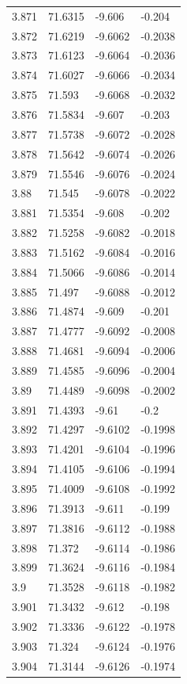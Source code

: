 \begin{tabular}{llll}
3.871 & 71.6315 & -9.606 & -0.204 \\
3.872 & 71.6219 & -9.6062 & -0.2038 \\
3.873 & 71.6123 & -9.6064 & -0.2036 \\
3.874 & 71.6027 & -9.6066 & -0.2034 \\
3.875 & 71.593 & -9.6068 & -0.2032 \\
3.876 & 71.5834 & -9.607 & -0.203 \\
3.877 & 71.5738 & -9.6072 & -0.2028 \\
3.878 & 71.5642 & -9.6074 & -0.2026 \\
3.879 & 71.5546 & -9.6076 & -0.2024 \\
3.88 & 71.545 & -9.6078 & -0.2022 \\
3.881 & 71.5354 & -9.608 & -0.202 \\
3.882 & 71.5258 & -9.6082 & -0.2018 \\
3.883 & 71.5162 & -9.6084 & -0.2016 \\
3.884 & 71.5066 & -9.6086 & -0.2014 \\
3.885 & 71.497 & -9.6088 & -0.2012 \\
3.886 & 71.4874 & -9.609 & -0.201 \\
3.887 & 71.4777 & -9.6092 & -0.2008 \\
3.888 & 71.4681 & -9.6094 & -0.2006 \\
3.889 & 71.4585 & -9.6096 & -0.2004 \\
3.89 & 71.4489 & -9.6098 & -0.2002 \\
3.891 & 71.4393 & -9.61 & -0.2 \\
3.892 & 71.4297 & -9.6102 & -0.1998 \\
3.893 & 71.4201 & -9.6104 & -0.1996 \\
3.894 & 71.4105 & -9.6106 & -0.1994 \\
3.895 & 71.4009 & -9.6108 & -0.1992 \\
3.896 & 71.3913 & -9.611 & -0.199 \\
3.897 & 71.3816 & -9.6112 & -0.1988 \\
3.898 & 71.372 & -9.6114 & -0.1986 \\
3.899 & 71.3624 & -9.6116 & -0.1984 \\
3.9 & 71.3528 & -9.6118 & -0.1982 \\
3.901 & 71.3432 & -9.612 & -0.198 \\
3.902 & 71.3336 & -9.6122 & -0.1978 \\
3.903 & 71.324 & -9.6124 & -0.1976 \\
3.904 & 71.3144 & -9.6126 & -0.1974 \\

\end{tabular}

